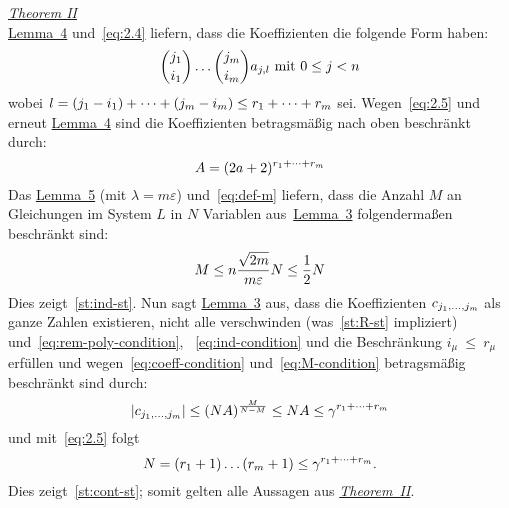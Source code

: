 \begin{namedproof}{\emph{\hyperref[subsec:th2]{Theorem II}}}
\begin{equation*}
            \end{equation*}
            \hyperref[subsec:lemma4]{Lemma~4} und~\eqref{eq:2.4} liefern, dass die Koeffizienten die folgende Form haben:
            \begin{equation*}
                \binom{j_1}{i_1} \dots \binom{j_m}{i_m}a_{j,l} \ \textrm{mit}\  0 \leq j < n
            \end{equation*}
            wobei $l = (j_1 - i_1) + \dots + (j_m - i_m) \leq r_1 + \dots + r_m$ sei.
            \textrm{Wegen~\eqref{eq:2.5} und erneut \hyperref[subsec:lemma4]{Lemma~4} sind die Koeffizienten betragsmäßig
            nach oben beschränkt durch:}
            \begin{equation}
                A = (2a + 2)^{r_1 + \dots + r_m} \label{eq:coeff-condition}
            \end{equation}
            \textrm{Das \hyperref[subsec:lemma5]{Lemma~5} (mit $\lambda = m \varepsilon$) und~\eqref{eq:def-m} liefern,
            dass die Anzahl $M$ an Gleichungen im System $L$ in $N$ Variablen aus~\hyperref[subsec:lemma3]{Lemma~3}
            folgendermaßen beschränkt sind:}
            \begin{equation}
                M \leq n \frac{\sqrt{2m}}{m \varepsilon} N \leq \frac{1}{2} N \label{eq:M-condition}
            \end{equation}
            Dies zeigt~\ref{st:ind-st}.
            \newline
            \textrm{Nun sagt \hyperref[subsec:lemma3]{Lemma~3} aus, dass die Koeffizienten $c_{j_1, \dots, j_m}$ als ganze
            Zahlen existieren, nicht alle verschwinden (was~\ref{st:R-st} impliziert) und~\eqref{eq:rem-poly-condition},
            ~\eqref{eq:ind-condition} und die Beschränkung $i_\mu~\leq~r_\mu$ erfüllen und wegen~\eqref{eq:coeff-condition}
            und~\eqref{eq:M-condition} betragsmäßig beschränkt sind durch:}
            \begin{equation*}
                \left| c_{j_1, \dots, j_m} \right| \leq (NA)^{\frac{M}{N-M}} \leq NA \leq \gamma^{r_1 + \dots + r_m}
            \end{equation*}
            und mit~\eqref{eq:2.5} folgt
            \begin{equation*}
                N = (r_1 + 1) \dots (r_m + 1) \leq \gamma^{r_1 + \dots + r_m}.
            \end{equation*}
            Dies zeigt~\ref{st:cont-st}; somit gelten alle Aussagen aus \hyperref[subsec:th2]{\emph{Theorem~II}}.
        \end{namedproof}
    

